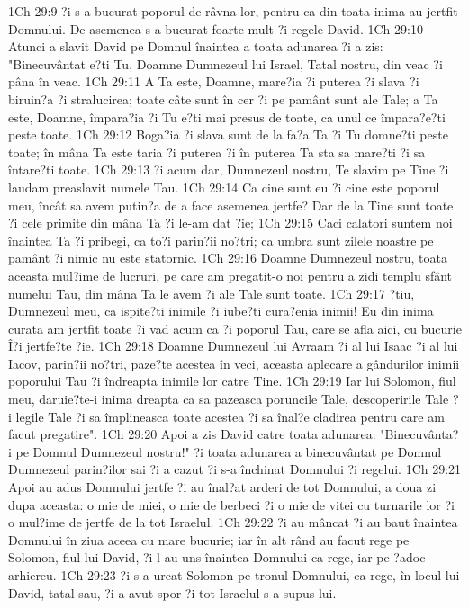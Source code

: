 1Ch 29:9  ?i s-a bucurat poporul de râvna lor, pentru ca din toata inima au jertfit Domnului. De asemenea s-a bucurat foarte mult ?i regele David.
1Ch 29:10  Atunci a slavit David pe Domnul înaintea a toata adunarea ?i a zis: "Binecuvântat e?ti Tu, Doamne Dumnezeul lui Israel, Tatal nostru, din veac ?i pâna în veac.
1Ch 29:11  A Ta este, Doamne, mare?ia ?i puterea ?i slava ?i biruin?a ?i stralucirea; toate câte sunt în cer ?i pe pamânt sunt ale Tale; a Ta este, Doamne, împara?ia ?i Tu e?ti mai presus de toate, ca unul ce împara?e?ti peste toate.
1Ch 29:12  Boga?ia ?i slava sunt de la fa?a Ta ?i Tu domne?ti peste toate; în mâna Ta este taria ?i puterea ?i în puterea Ta sta sa mare?ti ?i sa întare?ti toate.
1Ch 29:13  ?i acum dar, Dumnezeul nostru, Te slavim pe Tine ?i laudam preaslavit numele Tau.
1Ch 29:14  Ca cine sunt eu ?i cine este poporul meu, încât sa avem putin?a de a face asemenea jertfe? Dar de la Tine sunt toate ?i cele primite din mâna Ta ?i le-am dat ?ie;
1Ch 29:15  Caci calatori suntem noi înaintea Ta ?i pribegi, ca to?i parin?ii no?tri; ca umbra sunt zilele noastre pe pamânt ?i nimic nu este statornic.
1Ch 29:16  Doamne Dumnezeul nostru, toata aceasta mul?ime de lucruri, pe care am pregatit-o noi pentru a zidi templu sfânt numelui Tau, din mâna Ta le avem ?i ale Tale sunt toate.
1Ch 29:17  ?tiu, Dumnezeul meu, ca ispite?ti inimile ?i iube?ti cura?enia inimii! Eu din inima curata am jertfit toate ?i vad acum ca ?i poporul Tau, care se afla aici, cu bucurie Î?i jertfe?te ?ie.
1Ch 29:18  Doamne Dumnezeul lui Avraam ?i al lui Isaac ?i al lui Iacov, parin?ii no?tri, paze?te acestea în veci, aceasta aplecare a gândurilor inimii poporului Tau ?i îndreapta inimile lor catre Tine.
1Ch 29:19  Iar lui Solomon, fiul meu, daruie?te-i inima dreapta ca sa pazeasca poruncile Tale, descoperirile Tale ?i legile Tale ?i sa împlineasca toate acestea ?i sa înal?e cladirea pentru care am facut pregatire".
1Ch 29:20  Apoi a zis David catre toata adunarea: "Binecuvânta?i pe Domnul Dumnezeul nostru!" ?i toata adunarea a binecuvântat pe Domnul Dumnezeul parin?ilor sai ?i a cazut ?i s-a închinat Domnului ?i regelui.
1Ch 29:21  Apoi au adus Domnului jertfe ?i au înal?at arderi de tot Domnului, a doua zi dupa aceasta: o mie de miei, o mie de berbeci ?i o mie de vitei cu turnarile lor ?i o mul?ime de jertfe de la tot Israelul.
1Ch 29:22  ?i au mâncat ?i au baut înaintea Domnului în ziua aceea cu mare bucurie; iar în alt rând au facut rege pe Solomon, fiul lui David, ?i l-au uns înaintea Domnului ca rege, iar pe ?adoc arhiereu.
1Ch 29:23  ?i s-a urcat Solomon pe tronul Domnului, ca rege, în locul lui David, tatal sau, ?i a avut spor ?i tot Israelul s-a supus lui.
